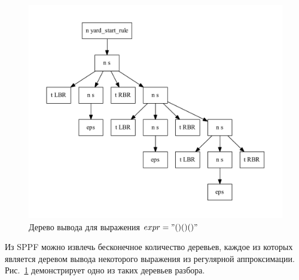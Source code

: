 \begin{figure}[!h]
 \centering
 \includegraphics[width=\textwidth]{Verbitskaya/pics/sppf3.pdf}
 \caption{Дерево вывода для выражения $expr="()()()"$}
 \label{sppf3}
\end{figure}

Из SPPF можно извлечь бесконечное количество деревьев, каждое из которых является деревом вывода некоторого выражения из регулярной аппроксимации. Рис.~\ref{sppf3} демонстрирует одно из таких деревьев разбора. 
